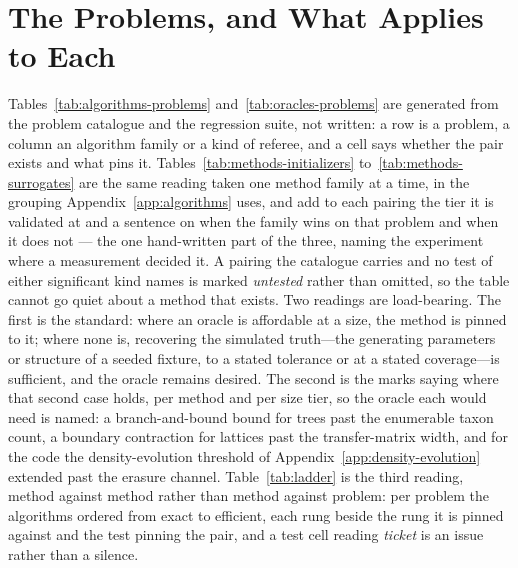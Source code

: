 \documentclass[11pt,a4paper]{article}
\begin{document}
\section{The Problems, and What Applies to Each}
\label{sec:applicability}

Tables~\ref{tab:algorithms-problems} and~\ref{tab:oracles-problems} are
generated from the problem catalogue and the regression suite, not written:
a row is a problem, a column an algorithm family or a kind of referee, and a
cell says whether the pair exists and what pins it.
Tables~\ref{tab:methods-initializers} to~\ref{tab:methods-surrogates} are the
same reading taken one method family at a time, in the grouping
Appendix~\ref{app:algorithms} uses, and add to each pairing the tier it is
validated at and a sentence on when the family wins on that problem and when it
does not --- the one hand-written part of the three, naming the experiment
where a measurement decided it. A pairing the catalogue carries and no test of
either significant kind names is marked \emph{untested} rather than omitted, so
the table cannot go quiet about a method that exists. Two readings are
load-bearing. The first is the standard: where an oracle is affordable at a
size, the method is pinned to it; where none is, recovering the simulated
truth---the generating parameters or structure of a seeded fixture, to a stated
tolerance or at a stated coverage---is sufficient, and the oracle remains
desired. The second is the marks saying where that second case holds, per
method and per size tier, so the oracle each would need is named: a
branch-and-bound bound for trees past the enumerable taxon count, a boundary
contraction for lattices past the transfer-matrix width, and for the code the
density-evolution threshold of Appendix~\ref{app:density-evolution} extended
past the erasure channel.
Table~\ref{tab:ladder} is the third reading, method against method rather than
method against problem: per problem the algorithms ordered from exact to
efficient, each rung beside the rung it is pinned against and the test pinning
the pair, and a test cell reading \emph{ticket} is an issue rather than a
silence.
\end{document}
